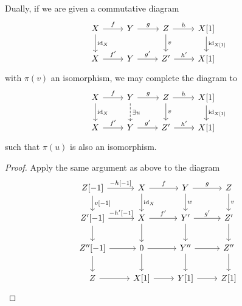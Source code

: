 \documentclass[dissertation.tex]{subfiles}
\begin{document}
\begin{lem}\label{VerdierExtendSquareDual}
  Dually, if we are given a commutative diagram
  $$\begin{tikzcd}
    X \arrow{r}{f}\arrow{d}{\id_X} & Y \arrow{r}{g} & Z \arrow{r}{h}\arrow{d}{v} & X[1]\arrow{d}{\id_{X[1]}}\\
    X \arrow{r}{f^\prime} & Y \arrow{r}{g^\prime} & Z^\prime \arrow{r}{h^\prime} & X[1]
  \end{tikzcd}$$
  with $\pi(v)$ an isomorphism, we may complete the diagram to 
  $$\begin{tikzcd}
    X \arrow{r}{f}\arrow{d}{\id_X} & Y \arrow{r}{g}\arrow[dashed]{d}{\exists u} & Z \arrow{r}{h}\arrow{d}{v} & X[1]\arrow{d}{\id_{X[1]}}\\
    X \arrow{r}{f^\prime} & Y \arrow{r}{g^\prime} & Z^\prime \arrow{r}{h^\prime} & X[1]
  \end{tikzcd}$$
  such that $\pi(u)$ is also an isomorphism.
  
  \begin{proof}
    Apply the same argument as above to the diagram
    $$\begin{tikzcd}
      Z[-1] \arrow{r}{-h[-1]}\arrow{d}{v[-1]} & X \arrow{r}{f}\arrow{d}{\id_X} & Y \arrow{r}{g}\arrow{d}{w} & Z\arrow{d}{v}\\
      Z^\prime[-1] \arrow{r}{-h^\prime[-1]}\arrow{d} & X \arrow{r}{f^\prime}\arrow{d} & Y^\prime\arrow{r}{g^\prime}\arrow{d} & Z^\prime\arrow{d}\\
      Z^{\prime\prime}[-1] \arrow{r}\arrow{d} & 0 \arrow{r}\arrow{d} & Y^{\prime\prime} \arrow{r}\arrow{d} & Z^{\prime\prime}\arrow{d}\\
      Z \arrow{r} & X[1] \arrow{r} & Y[1] \arrow{r} & Z[1]
    \end{tikzcd}$$
  \end{proof}
\end{lem}
\end{document}
